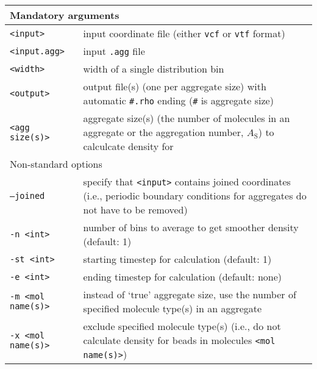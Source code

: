 \noindent
\begin{longtable}{p{}p{}}
  \toprule
  \multicolumn{2}{l}{Mandatory arguments} \\
  \midrule
  \texttt{<input>} & input coordinate file (either \texttt{vcf} or
    \texttt{vtf} format) \\
  \texttt{<input.agg>} & input \texttt{.agg} file \\
  \texttt{<width>} & width of a single distribution bin \\
  \texttt{<output>} & output file(s) (one per aggregate size) with
    automatic \texttt{\#.rho} ending (\texttt{\#} is aggregate size) \\
  \texttt{<agg size(s)>} & aggregate size(s) (the number of molecules in an
    aggregate or the aggregation number, $A_{\mathrm{S}}$) to calculcate
    density for \\
  \toprule
  \multicolumn{2}{l}{Non-standard options} \\
  \midrule
  \texttt{--joined} & specify that \texttt{<input>} contains joined
    coordinates (i.e., periodic boundary conditions for aggregates do not
    have to be removed) \\
  \texttt{-n <int>} & number of bins to average to get smoother density
    (default: 1) \\
  \texttt{-st <int>} & starting timestep for calculation (default: 1) \\
  \texttt{-e <int>} & ending timestep for calculation (default: none) \\
  \texttt{-m <mol name(s)>} & instead of `true' aggregate size, use the number
    of specified molecule type(s) in an aggregate \\
  \texttt{-x <mol name(s)>} & exclude specified molecule type(s) (i.e., do
    not calculate density for beads in molecules \texttt{<mol name(s)>}) \\
  \bottomrule
\end{longtable}

